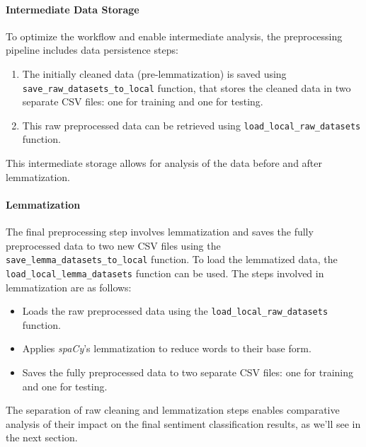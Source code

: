 \documentclass[12pt]{article}
\begin{document}
\paragraph{Intermediate Data Storage}
To optimize the workflow and enable intermediate analysis, the preprocessing pipeline includes data persistence steps:

\begin{enumerate}
    \item The initially cleaned data (pre-lemmatization) is saved using \\ \texttt{save\_raw\_datasets\_to\_local} function, that stores the cleaned data in two separate CSV files: one for training and one for testing.
    \item This raw preprocessed data can be retrieved using \texttt{load\_local\_raw\_datasets} function.
\end{enumerate}
This intermediate storage allows for analysis of the data before and after lemmatization.

\paragraph{Lemmatization}
The final preprocessing step involves lemmatization and saves the fully preprocessed data to two new CSV files using the \texttt{save\_lemma\_datasets\_to\_local} function. To load the lemmatized data, the \texttt{load\_local\_lemma\_datasets} function can be used.
The steps involved in lemmatization are as follows:
\begin{itemize}
    \item Loads the raw preprocessed data using the \texttt{load\_local\_raw\_datasets} function.
    \item Applies \textit{spaCy}'s lemmatization to reduce words to their base form.
    \item Saves the fully preprocessed data to two separate CSV files: one for training and one for testing.
\end{itemize}

The separation of raw cleaning and lemmatization steps enables comparative analysis of their impact on the final sentiment classification results, as we'll see in the next section.


\end{document}

